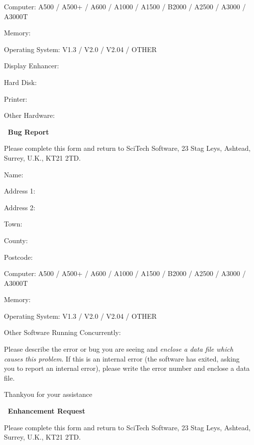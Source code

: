 Computer: A500 / A500+ / A600 / A1000 / A1500 / B2000 / A2500 / A3000 / A3000T

Memory:\hrulefill

Operating System: V1.3 / V2.0 / V2.04 / OTHER\hrulefill

Display Enhancer:\hrulefill

Hard Disk:\hrulefill

Printer:\hrulefill

Other Hardware:\hrulefill

\newpage
\thispagestyle{empty}
\begin{center}
\Large\amplot\bf\ Bug Report
\end{center}
\vspace*{1ex}
Please complete this form and return to {\sf SciTech Software}, 23 
Stag Leys, Ashtead, Surrey, U.K., KT21 2TD.
\vspace*{3em}

Name:\hrulefill

Address 1:\hrulefill

Address 2:\hrulefill

Town:\hrulefill

County:\hrulefill

Postcode:\hrulefill
\vspace*{2em}

Computer: A500 / A500+ / A600 / A1000 / A1500 / B2000 / A2500 / A3000 / A3000T

Memory:\hrulefill

Operating System: V1.3 / V2.0 / V2.04 / OTHER\hrulefill

Other Software Running Concurrently:\hrulefill
\vspace*{1em}

Please describe the error or bug you are seeing and {\em enclose a data file which
causes this problem}.
If this is an internal error (the software has exited, asking you to report an 
internal error), please write the error number and enclose a data file.
\vfill\vfill
\begin{center}
Thankyou for your assistance 
\end{center}

\newpage
\thispagestyle{empty}
\begin{center}
\Large\amplot\bf\ Enhancement Request
\end{center}
\vspace*{1ex}
Please complete this form and return to {\sf SciTech Software}, 23 
Stag Leys, Ashtead, Surrey, U.K., KT21 2TD.
\vspace*{3em}

